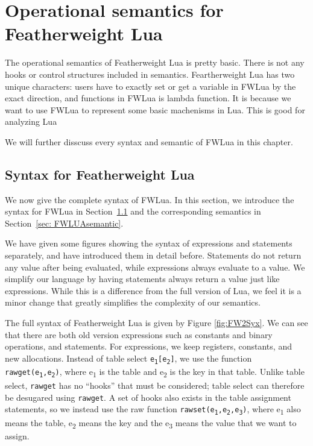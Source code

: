 \chapter{Operational semantics for Featherweight Lua} \label{chp: syntax and semantic}
The operational semantics of Featherweight Lua is pretty basic. There is not any hooks or control structures included in semantics. Feartherweight Lua has two unique characters: users have to exactly set or get a variable in FWLua by the exact direction, and functions in FWLua is lambda function. It is because we want to use FWLua to represent some basic machenisms in Lua. This is good for analyzing Lua

We will further disscuss every syntax and semantic of FWLua in this chapter.


\section{Syntax for Featherweight Lua}\label{sec: FWLUAsyntax}
We now give the complete syntax of FWLua. In this section, we introduce the syntax for FWLua in Section~\ref{sec: FWLUAsyntax} and the corresponding semantics in Section~\ref{sec: FWLUAsemantic}.

We have given some figures showing the syntax of expressions and statements separately, and have introduced them in detail before.
Statements do not return any value after being evaluated, while expressions always evaluate to a value.
We simplify our language by
having statements always return a value just like expressions.
While this is a difference from the full version of Lua,
we feel it is a minor change that greatly simplifies the complexity
of our semantics.

The full syntax of Featherweight Lua is given by Figure \ref{fig:FW2Syx}. We can see that there are both old version expressions such as constants and binary operations, and statements. For expressions, we keep registers, constants, and new allocations.
Instead of table select {\tt e\textsubscript{1}[e\textsubscript{2}]}, we use the function {\tt rawget(e\textsubscript{1},e\textsubscript{2})}, where e\textsubscript{1} is the table and e\textsubscript{2} is the key in that table.
Unlike table select, {\tt rawget} has no ``hooks'' that must be considered; table select can therefore be desugared using {\tt rawget}.
A set of hooks also exists in the table assignment statements, so we instead use the raw function {\tt rawset(e\textsubscript{1},e\textsubscript{2},e\textsubscript{3})}, where e\textsubscript{1} also means the table, e\textsubscript{2} means the key and the e\textsubscript{3} means the value that we want to assign.

